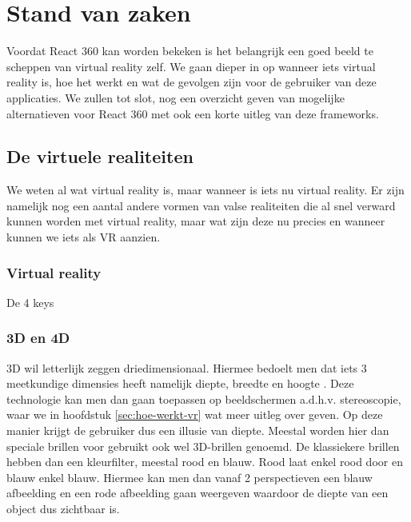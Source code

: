 \chapter{Stand van zaken}
\label{ch:stand-van-zaken}



Voordat React 360 kan worden bekeken is het belangrijk een goed beeld te scheppen van virtual reality zelf. We gaan dieper in op wanneer iets virtual reality is, hoe het werkt en wat de gevolgen zijn voor de gebruiker van deze applicaties. We zullen tot slot, nog een overzicht geven van mogelijke alternatieven voor React 360 met ook een korte uitleg van deze frameworks.

\section{De virtuele realiteiten}
\label{sec:wanner-vr}
We weten al wat virtual reality is, maar wanneer is iets nu virtual reality. Er zijn namelijk nog een aantal andere vormen van valse realiteiten die al snel verward kunnen worden met virtual reality, maar wat zijn deze nu precies en wanneer kunnen we iets als VR aanzien.

\subsection{Virtual reality}
\label{subsec:virtual-reality}
\autocite{Sherman2000}
De 4 keys

\subsection{3D en 4D}
\label{subsec:3d-4d}
3D wil letterlijk zeggen driedimensionaal. Hiermee bedoelt men dat iets 3 meetkundige dimensies heeft namelijk diepte, breedte en hoogte \autocite{Wikipedia3D2018}. Deze technologie kan men dan gaan toepassen op beeldschermen a.d.h.v. stereoscopie, waar we in hoofdstuk \ref{sec:hoe-werkt-vr} wat meer uitleg over geven. Op deze manier krijgt de gebruiker dus een illusie van diepte. Meestal worden hier dan speciale brillen voor gebruikt ook wel 3D-brillen genoemd. De klassiekere brillen hebben dan een kleurfilter, meestal rood en blauw. Rood laat enkel rood door en blauw enkel blauw. Hiermee kan men dan vanaf 2 perspectieven een blauw afbeelding en een rode afbeelding gaan weergeven waardoor de diepte van een object dus zichtbaar is.

